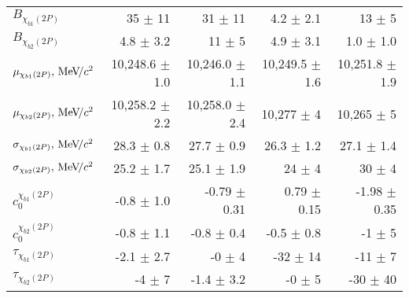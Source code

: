 \begin{table}[H]
{{\begin{tabular}{lrrrr}
\rule{0pt}{4ex}$B_{\chi_{b1}(2P)}$ & 35 $\pm$ 11 & 31 $\pm$ 11 & 4.2 $\pm$ 2.1 & 13 $\pm$ 5\\
$B_{\chi_{b2}(2P)}$ & 4.8 $\pm$ 3.2 & 11 $\pm$ 5 & 4.9 $\pm$ 3.1 & 1.0 $\pm$ 1.0\\

\rule{0pt}{4ex}$\mu_{\chi_{b1}(2P)}, {\mathrm{\,Me\kern -0.1em V\!/}c^2}$ & 10,248.6 $\pm$ 1.0 & 10,246.0 $\pm$ 1.1 & 10,249.5 $\pm$ 1.6 & 10,251.8 $\pm$ 1.9\\
$\mu_{\chi_{b2}(2P)}, {\mathrm{\,Me\kern -0.1em V\!/}c^2}$ & 10,258.2 $\pm$ 2.2 & 10,258.0 $\pm$ 2.4 & 10,277 $\pm$ 4 & 10,265 $\pm$ 5\\

\rule{0pt}{4ex}$\sigma_{\chi_{b1}(2P)}, {\mathrm{\,Me\kern -0.1em V\!/}c^2}$ & 28.3 $\pm$ 0.8 & 27.7 $\pm$ 0.9 & 26.3 $\pm$ 1.2 & 27.1 $\pm$ 1.4\\
$\sigma_{\chi_{b2}(2P)}, {\mathrm{\,Me\kern -0.1em V\!/}c^2}$ & 25.2 $\pm$ 1.7 & 25.1 $\pm$ 1.9 & 24 $\pm$ 4 & 30 $\pm$ 4\\

\rule{0pt}{4ex}$c_0^{\chi_{b1}(2P)}$ & -0.8 $\pm$ 1.0 & -0.79 $\pm$ 0.31 & 0.79 $\pm$ 0.15 & -1.98 $\pm$ 0.35\\
$c_0^{\chi_{b2}(2P)}$ & -0.8 $\pm$ 1.1 & -0.8 $\pm$ 0.4 & -0.5 $\pm$ 0.8 & -1 $\pm$ 5\\

\rule{0pt}{4ex}$\tau_{\chi_{b1}(2P)}$ & -2.1 $\pm$ 2.7 & -0 $\pm$ 4 & -32 $\pm$ 14 & -11 $\pm$ 7\\
$\tau_{\chi_{b2}(2P)}$ & -4 $\pm$ 7 & -1.4 $\pm$ 3.2 & -0 $\pm$ 5 & -30 $\pm$ 40\\
\bottomrule
\end{tabular}
} %

} %
\label{tab:mc:chib2p_ups1s:fits}
\end{table}

